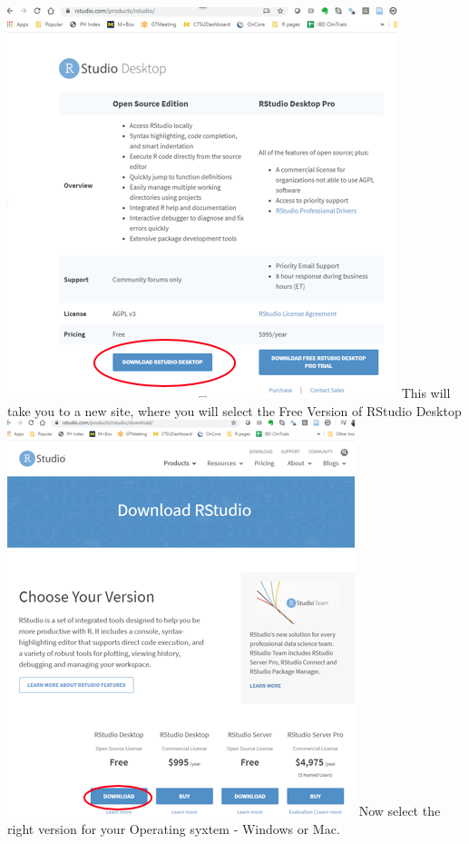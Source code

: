 \documentclass[
]{book}
\begin{document}
\includegraphics{images/rstudio_opensource.png}
This will take you to a new site, where you will select the Free Version of RStudio Desktop
\includegraphics{images/rstudio_free.png}
Now select the right version for your Operating syxtem - Windows or Mac.
\end{document}
